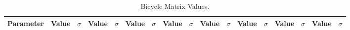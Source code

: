 \documentclass[../report/parameterReport.tex]{subfiles}
\begin{document}
\begin{landscape}
\begin{table}[tb]
\begin{center}
\caption{Bicycle Matrix Values.}
{\small
\begin{tabular}{l|rr|rr|rr|rr|rr|rr|rr|rr}
Parameter & Value & $\sigma$ & Value & $\sigma$
          & Value & $\sigma$ & Value & $\sigma$
          & Value & $\sigma$ & Value & $\sigma$
          & Value & $\sigma$ & Value & $\sigma$\\
\hline
\end{tabular}
}
\end{center}
\end{table}
\end{landscape}
\end{document}
